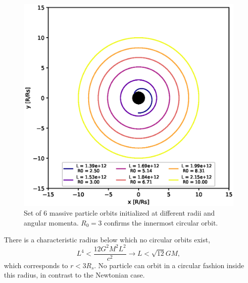 \documentclass[journal, a4paper]{IEEEtran}
\begin{document}
\begin{figure}[!hbt]
	\begin{center}
	\includegraphics[width=\columnwidth]{massive_geodesics.eps}
	\caption{Set of 6 massive particle orbits initialized at different radii and angular momenta. $R_0=3$ confirms the innermost circular orbit.}
	\label{fig::massive_geodesics}
\end{center}
\end{figure}

There is a characteristic radius below which no circular orbits exist, 
\begin{equation}
	L^4 < \frac{ 12 G^2 M^2 L^2}{ c^2} \rightarrow L < \sqrt{12 } G M,
\end{equation}
which corresponds to $r<3 R_s$. No particle can orbit in a circular fashion inside this radius, in contrast to the Newtonian case.
\end{document}
